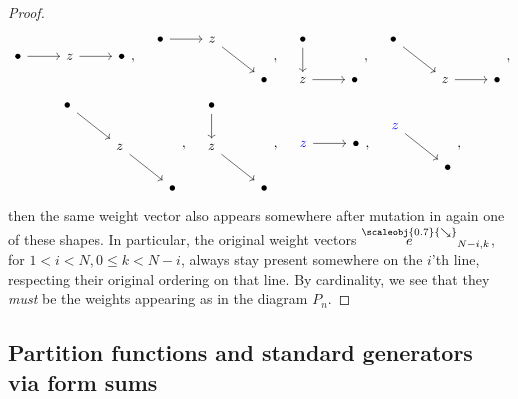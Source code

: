 \documentclass[11pt, reqno]{amsart}
\theoremstyle{definition}
\numberwithin{equation}{section}
\newcommand{\sears}{\scaleobj{0.7}{\searrow}}
\newcommand{\seee}{\overset{\sears}{e}}
\begin{document}
\begin{proof}
\[
\begin{tikzcd}
	 \bullet & z 	 &	\bullet
    \arrow[from=1-1, to=1-2]
	\arrow[from=1-2, to=1-3]
\end{tikzcd}, \quad
\begin{tikzcd}
	   \bullet &z &\\
	&& \bullet 
	\arrow[from=1-1, to=1-2]
	\arrow[from=1-2, to=2-3]
\end{tikzcd},\quad
\begin{tikzcd}
	 \bullet  &  \\
	  z & \bullet
	\arrow[from=1-1, to=2-1]
	\arrow[from=2-1, to=2-2]
\end{tikzcd},\quad 
\begin{tikzcd}
	 \bullet &&  \\
	& z &\bullet	
    \arrow[from=1-1, to=2-2]
	\arrow[from=2-2, to=2-3]
\end{tikzcd},
\]
\[
\begin{tikzcd}
	 \bullet &&  \\
	& z &	\\
    & &  \bullet
    \arrow[from=1-1, to=2-2]
	\arrow[from=2-2, to=3-3]
\end{tikzcd},\quad 
\begin{tikzcd}
	 \bullet &  \\
	 z& 	\\
     &  \bullet
    \arrow[from=1-1, to=2-1]
	\arrow[from=2-1, to=3-2]
\end{tikzcd}, \quad 
\begin{tikzcd}
	 \color{blue}{z} & \bullet
    \arrow[from=1-1, to=1-2]
\end{tikzcd},\quad 
\begin{tikzcd}
	 \color{blue}{z} \\ & \bullet
    \arrow[from=1-1, to=2-2]
\end{tikzcd},
\]
then the same weight vector also appears somewhere after mutation in again one of these shapes. In particular, the original weight vectors $\seee_{N-i,k}$, for $1 < i< N, 0\leq k <N-i$, always stay present somewhere on the $i$'th line, respecting their original ordering on that line. By cardinality, we see that they \emph{must} be the weights appearing as in the diagram $P_n$. 

\end{proof}

\subsection{Partition functions and standard generators via form sums}\label{SecStandGen}
\end{document}
